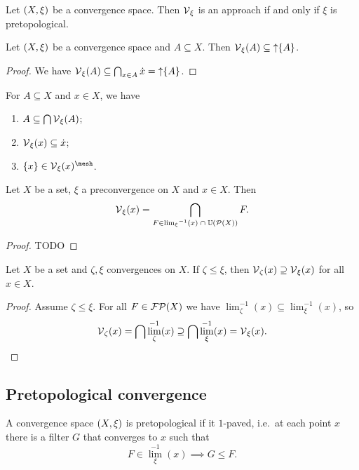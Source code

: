 \begin{lemma}
Let $\sSet{X,\xi}$ be a convergence space. Then $\operatorname{\mathcal{V}}_\xi$ is an approach \textup{if and only if} $\xi$ is pretopological.
\end{lemma}

\begin{lemma} \label{vicinityOfSetLemma}
Let $\sSet{X,\xi}$ be a convergence space and $A\subseteq X$. Then $\operatorname{\mathcal{V}}_\xi(A) \subseteq \operatorname{\uparrow}\{A\}$.
\end{lemma}
\begin{proof}
We have $\operatorname{\mathcal{V}}_\xi(A) \subseteq \bigcap_{x\in A}\dot{x} = \operatorname{\uparrow} \{A\}$. 
\end{proof}
\begin{corollary} \label{vicinityOfSetCorollary}
For $A\subseteq X$ and $x\in X$, we have
\begin{enumerate}
\item $A \subseteq \bigcap\operatorname{\mathcal{V}}_\xi(A)$;
\item $\operatorname{\mathcal{V}}_\xi(x) \subseteq \dot{x}$;
\item $\{x\}\in\vicinities_\xi(x)^{\mesh}$.
\end{enumerate}
\end{corollary}

\begin{lemma}
Let $X$ be a set, $\xi$ a preconvergence on $X$ and $x\in X$. Then
\[ \operatorname{\mathcal{V}}_\xi(x) = \bigcap_{F\in {\lim_\xi}^{-1}(x)\;\cap\; \operatorname{\mathbb{U}}(\operatorname{\mathcal{P}}(X))}F. \]
\end{lemma}
\begin{proof}
TODO
\end{proof}

\begin{lemma} \label{vicinityMapAntitone}
Let $X$ be a set and $\zeta, \xi$ convergences on $X$. If $\zeta \leq \xi$, then $\operatorname{\mathcal{V}}_\zeta(x) \supseteq \operatorname{\mathcal{V}}_\xi(x)$ for all $x\in X$.
\end{lemma}
\begin{proof}
Assume $\zeta \leq \xi$. For all $F\in \operatorname{\mathcal{FP}}(X)$ we have $\lim_\zeta^{-1}(x) \subseteq \lim_\xi^{-1}(x)$, so
\[ \operatorname{\mathcal{V}}_\zeta(x) = \bigcap \lim_\zeta^{-1}(x) \supseteq \bigcap \lim_\xi^{-1}(x) = \operatorname{\mathcal{V}}_\xi(x). \]
\end{proof}


\subsection{Pretopological convergence}
A convergence space $\sSet{X,\xi}$ is pretopological if it $1$-paved, i.e.\ at each point $x$ there is a filter $G$ that converges to $x$ such that
\[ F\in {\lim}_\xi^{-1}(x) \implies G \leq F. \]

